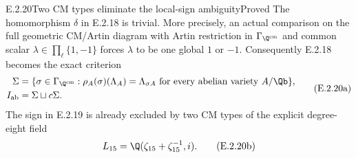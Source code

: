 \begin{result}{E.2.20}{Two CM types eliminate the local-sign ambiguity}{Proved}
The homomorphism \(\delta\) in E.2.18 is trivial. More precisely,
an actual comparison on the full geometric CM/Artin diagram
with Artin restriction in \(\Gamma_{\Q^{\mathrm{cm}}}\)
and common scalar \(\lambda\in\prod_\ell\{1,-1\}\)
forces \(\lambda\) to be one global \(1\) or \(-1\).
Consequently E.2.18 becomes the exact criterion
\[
 \begin{split}
 \Sigma
  &=\{\sigma\in\Gamma_{\Q^{\mathrm{cm}}}:
       \rho_A(\sigma)(\Lambda_A)=\Lambda_{\sigma A}
       \text{ for every abelian variety }A/\Qb\},\\
 I_{\mathrm{ab}}&=\Sigma\sqcup c\Sigma.
 \end{split}
 \tag{E.2.20a}
\]
The sign in E.2.19 is already excluded by two CM types
of the explicit degree-eight field
\[
 L_{15}=\Q(\zeta_{15}+\zeta_{15}^{-1},i).
 \tag{E.2.20b}
\]
\end{result}
